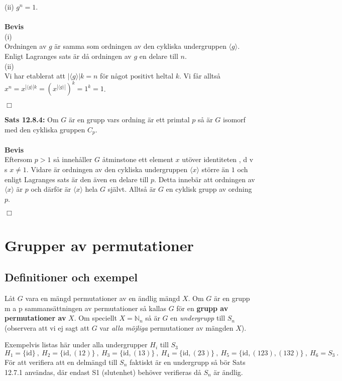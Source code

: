 \documentclass{article}
\begin{document}
(ii) $g^n=1$.\\ \\
\textbf{Bevis}\\
(i)\\ 
Ordningen av $g$ är samma som ordningen av den cykliska undergruppen $\langle g\rangle$. Enligt Lagranges sats är då ordningen av $g$ en delare till $n$.\\
(ii)\\ 
Vi har etablerat att $|\langle g\rangle|k=n$ för något positivt heltal $k$. Vi får alltså $x^n=x^{|\langle g\rangle|k}=(x^{|\langle g\rangle|})^k=1^k=1$.
\begin{flushright}
$\Box$
\end{flushright}
\textbf{Sats 12.8.4:} Om $G$ är en grupp vars ordning är ett primtal $p$ så är $G$ isomorf med den cykliska gruppen $C_p$.\\ \\
\textbf{Bevis}\\
Eftersom $p>1$ så innehåller $G$ åtminstone ett element $x$ utöver identiteten , d v s $x\neq1$. Vidare är ordningen av den cykliska undergruppen $\langle x\rangle$ större än $1$ och enligt Lagranges sats är den även en delare till $p$. Detta innebär att ordningen av $\langle x\rangle$
är $p$ och därför är $\langle x\rangle$ hela $G$ självt. Alltså är $G$ en cyklisk grupp av ordning $p$.
\begin{flushright}
$\Box$
\end{flushright}


\section{Grupper av permutationer}
\subsection{Definitioner och exempel}
Låt $G$ vara en mängd permutationer av en ändlig mängd $X$. Om $G$ är en grupp m a p sammansättningen av permutationer så kallas $G$ för en \textbf{grupp av permutationer av} $X$. Om speciellt $X=\mathbb{N}_n$ så är $G$ en \textit{undergrupp} till $S_n$ (observera att vi ej sagt att $G$ var \textit{alla möjliga} permutationer av mängden $X$).

Exempelvis listas här under alla undergrupper $H_i$ till $S_3$
$$
H_1=\{\textrm{id}\} \ , \ H_2=\{\textrm{id},(12)\} \ , \ H_3=\{\textrm{id},(13)\} \ , \ H_4=\{\textrm{id},(23)\} \ , \ H_5=\{\textrm{id},(123),(132)\} \ , \ H_6=S_3 \ .
$$
För att verifiera att en delmängd till $S_n$ faktiskt är en undergrupp så bör Sats 12.7.1 användas, där endast S1 (slutenhet) behöver verifieras då $S_n$ är ändlig.
\end{document}

